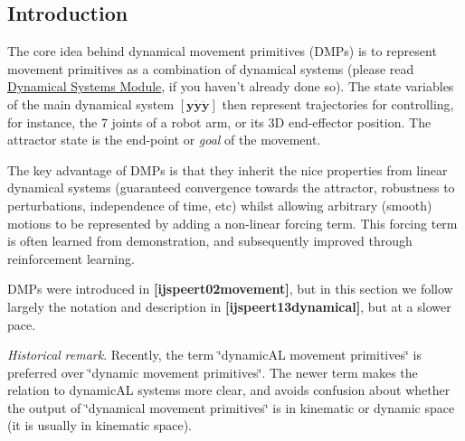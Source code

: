 \hypertarget{page_dmp_sec_dmp_introduction}{}\subsection{Introduction}\label{page_dmp_sec_dmp_introduction}
The core idea behind dynamical movement primitives (D\+M\+Ps) is to represent movement primitives as a combination of dynamical systems (please read \hyperlink{page_dyn_sys}{Dynamical Systems Module}, if you haven't already done so). The state variables of the main dynamical system $ [\mathbf{y \dot{y} \ddot{y}} ]$ then represent trajectories for controlling, for instance, the 7 joints of a robot arm, or its 3\+D end-\/effector position. The attractor state is the end-\/point or {\itshape goal} of the movement.

The key advantage of D\+M\+Ps is that they inherit the nice properties from linear dynamical systems (guaranteed convergence towards the attractor, robustness to perturbations, independence of time, etc) whilst allowing arbitrary (smooth) motions to be represented by adding a non-\/linear forcing term. This forcing term is often learned from demonstration, and subsequently improved through reinforcement learning.

D\+M\+Ps were introduced in {\bfseries [ijspeert02movement]}, but in this section we follow largely the notation and description in {\bfseries [ijspeert13dynamical]}, but at a slower pace.

{\itshape Historical} {\itshape remark}. Recently, the term \char`\"{}dynamic\+A\+L movement primitives\char`\"{} is preferred over \char`\"{}dynamic movement primitives\char`\"{}. The newer term makes the relation to dynamic\+A\+L systems more clear, and avoids confusion about whether the output of \char`\"{}dynamical movement primitives\char`\"{} is in kinematic or dynamic space (it is usually in kinematic space).

